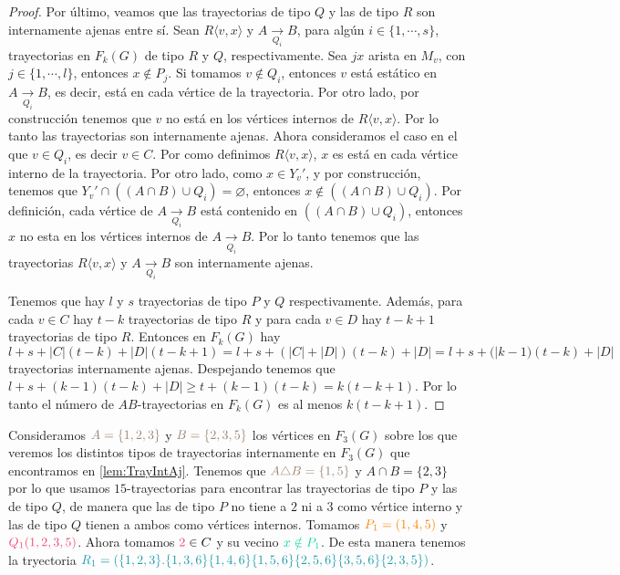 \begin{proof}
    Por \'ultimo, veamos que las trayectorias de tipo $Q$ y las de tipo $R$ son
    internamente ajenas entre s\'i. Sean $R\langle v,x \rangle$ y $A
    \xrightarrow[Q_i]{}  B$, para alg\'un $i \in \{1, \cdots, s\}$, trayectorias
    en $F_k(G)$ de tipo $R$ y $Q$, respectivamente. Sea $jx$ arista en $M_v$,
    con $j \in \{1, \cdots, l\}$, entonces $x \notin P_j$. Si tomamos $v \notin
    Q_i$, entonces $v$ est\'a est\'atico en $A \xrightarrow[Q_i]{} B$, es decir,
    est\'a en cada v\'ertice de la trayectoria. Por otro lado, por
    construcci\'on tenemos que $v$ no est\'a en los v\'ertices internos de $R
    \langle v, x \rangle$. Por lo tanto las trayectorias son internamente
    ajenas. Ahora consideramos el caso en el que $v \in Q_i$, es decir $v \in
    C$. Por como definimos $R \langle v,x \rangle$, $x$ es est\'a en cada
    v\'ertice interno de la trayectoria. Por otro lado, como $x \in Y_v'$, y por
    construcci\'on, tenemos que $Y_v ' \cap ((A\cap B) \cup Q_i) = \varnothing$,
    entonces $x \notin ((A \cap B) \cup Q_i)$. Por definici\'on, cada v\'ertice
    de $A \xrightarrow[Q_i]{}  B$ est\'a contenido en $((A \cap B) \cup Q_i)$,
    entonces $x$ no esta en los v\'ertices internos de $A \xrightarrow[Q_i]{}
    B$. Por lo tanto tenemos que las trayectorias $R \langle v,x \rangle$ y $A
    \xrightarrow[Q_i]{}  B$ son internamente ajenas.

    Tenemos que hay $l$ y $s$ trayectorias de tipo $P$ y $Q$ respectivamente.
    Adem\'as, para cada $v \in C$ hay $t-k$ trayectorias de tipo $R$ y para cada
    $v \in D$ hay $t-k+1$ trayectorias de tipo $R$. Entonces en $F_k(G)$ hay $l+
    s+ |C|(t-k)+ |D|(t-k +1) = l + s + (|C| + |D|)(t-k) + |D| = l + s +
    (|k-1)(t-k) + |D|$ trayectorias internamente ajenas. Despejando tenemos que
    $l + s + (k-1)(t-k) + |D| \geq t+ (k-1)(t-k) = k (t -k +1)$. Por lo tanto el
    n\'umero de $AB$-trayectorias en $F_k(G)$ es al menos $k(t-k+1)$.
\end{proof}

Consideramos ${\color{baige}A= \{1,2,3\}}$ y ${\color{baige}B=\{2,3,5\}}$ los v\'ertices en $F_3(G)$ sobre los
que veremos los distintos tipos de trayectorias internamente en $F_3(G)$ que
encontramos en \cref{lem:TrayIntAj}. Tenemos que ${\color{baige}A\triangle
B=\{1,5\}}$ y $A\cap B=\{2,3\}$ por lo que usamos $15$-trayectorias para
encontrar las trayectorias de tipo $P$ y las de tipo $Q$, de manera que las de
tipo $P$ no tiene a $2$ ni a $3$ como v\'ertice interno y las de tipo $Q$ tienen
a ambos como v\'ertices internos. Tomamos ${\color{naranja}P_1=(1,4,5)}$ y
${\color{fushia}Q_1(1,2,3,5)}$. Ahora tomamos ${\color{fushia}2} \in C$ y su vecino
${\color{menta}x\notin P_1}$. De esta manera tenemos la tryectoria
${\color{verdeAzulado}R_1=(\{1,2,3\}.\{1,3,6\}\{1,4,6\}\{1,5,6\}\{2,5,6\}\{3,5,6\}\{2,3,5\})}$.


